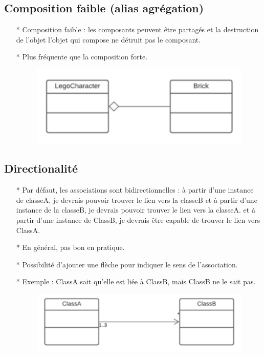 \documentclass[12pt]{article}
\begin{document}
\subsection{Composition faible (alias agrégation)}
\begin{itemize}
	\item[* ] Composition faible : les composants peuvent être partagés et la destruction de l'objet
	l'objet qui compose ne détruit pas le composant.
	\item[* ]  Plus fréquente que la composition forte.
	\newpage
		\begin{figure}[!hbtp]
		\centering
		\includegraphics[scale=0.75]{Capture16.PNG}
	\end{figure}
\end{itemize}
\subsection{Directionalité}
\begin{itemize}
	\item[* ] Par défaut, les associations sont bidirectionnelles : à partir d'une instance de
	classeA, je devrais pouvoir trouver le lien vers la classeB et à partir d'une instance de la classeB, je devrais pouvoir trouver le lien vers la classeA.
	et à partir d'une instance de ClassB, je devrais être capable de trouver le lien vers ClassA.
	\item[* ]  En général, pas bon en pratique.
	\item[* ] Possibilité d'ajouter une flèche pour indiquer le sens de l'association.
	\item[* ] Exemple : ClassA sait qu'elle est liée à ClassB, mais ClassB ne le sait pas.
		\begin{figure}[!hbtp]
		\centering
		\includegraphics[scale=0.75]{Capture17.PNG}
	\end{figure}
\end{itemize}
\end{document}

